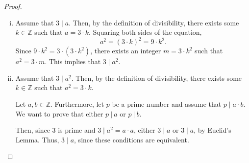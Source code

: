 \documentclass{article}
\begin{document}
\begin{enumerate}
\begin{proof}
                    \begin{enumerate}[i.]
                        \item Assume that $3 \mid a$. Then, by the definition of divisibility, there exists some $k\in\mathbb{Z}$ such that $a = 3\cdot k$. Squaring both sides of the equation,
                            \[
                                a^2 = (3\cdot k)^2 = 9\cdot k^2.
                            \]
                        \ppar Since $9\cdot k^2 = 3\cdot(3\cdot k^2)$, there exists an integer $m = 3\cdot k^2$ such that $a^2 = 3\cdot m$. This implies that $3 \mid a^2$. \\
                        \item Assume that $3 \mid a^2$. Then, by the definition of divisibility, there exists some $k\in\mathbb{Z}$ such that $a^2 = 3\cdot k$.
                            \begin{subproof}
                                Let $a,b\in\mathbb{Z}$. Furthermore, let $p$ be a prime number and assume that $p \mid a\cdot b$. We want to prove that either $p\ | \ a$ or $p\ | \ b$.
                                \begin{caseof}
                                \end{caseof}
                            \end{subproof}
                        Then, since $3$ is prime and $3 \mid a^2 = a\cdot a$, either $3 \mid a$ or $3 \mid a$, by Euclid's Lemma. Thus, $3 \mid a$, since these conditions are equivalent. 
                    

\end{enumerate}
\end{proof}
\end{enumerate}
\end{document}
